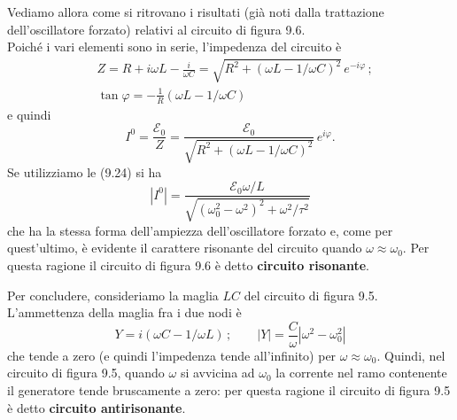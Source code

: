 Vediamo allora come si ritrovano i risultati (gi\`a noti dalla trattazione
dell'oscillatore forzato) relativi al circuito di figura 9.6.\\
Poich\'e i vari elementi sono in serie, l'impedenza del circuito \`e
\begin{equation}
  \begin{aligned}
    &Z=R+i\omega L-\frac{i}{\omega C}
    =\sqrt{R^2+(\omega L-1/\omega C)^2}\,e^{-i\varphi}\,;\\
    &\tan\varphi=-\frac{1}{R}(\omega L-1/\omega C)
  \end{aligned}
  \tag{9.45}
\end{equation}
e quindi
\begin{equation}
  I^0=\frac{\mathcal E_0}{Z}
  =\frac{\mathcal E_0}{\sqrt{R^2+(\omega L-1/\omega C)^2}}\,e^{i\varphi}.
  \tag{9.46}
\end{equation}
Se utilizziamo le (9.24) si ha
\begin{equation}
  |I^0|
  =\frac{\mathcal E_0\omega/L}{\sqrt{(\omega_0^2-\omega^2)^2+\omega^2/\tau^2}}
  \tag{9.47}
\end{equation}
che ha la stessa forma dell'ampiezza dell'oscillatore forzato e, come per
quest'ultimo, \`e evidente il carattere risonante del circuito quando
$\omega\approx\omega_0$. Per questa ragione il circuito di figura 9.6 \`e detto
\textbf{circuito risonante}.

Per concludere, consideriamo la maglia $LC$ del circuito di figura 9.5.
L'ammettenza della maglia fra i due nodi \`e
\begin{equation}
  Y=i(\omega C-1/\omega L)\,;\qquad|Y|=\frac{C}{\omega}|\omega^2-\omega_0^2|
  \tag{9.48}
\end{equation}
che tende a zero (e quindi l'impedenza tende all'infinito) per
$\omega\approx\omega_0$. Quindi, nel circuito di figura 9.5, quando $\omega$ si
avvicina ad $\omega_0$ la corrente nel ramo contenente il generatore tende
bruscamente a zero: per questa ragione il circuito di figura 9.5 \`e detto
\textbf{circuito antirisonante}.
